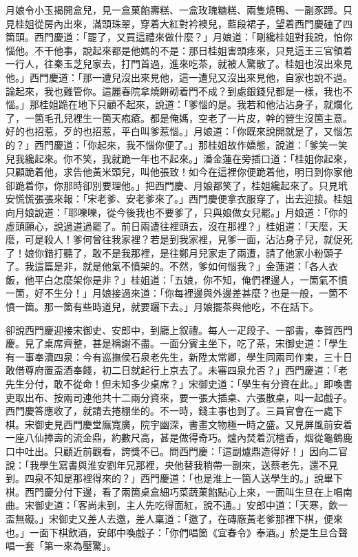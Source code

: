 月娘令小玉揭開盒兒，見一盒菓餡壽糕、一盒玫瑰糖糕、兩隻燒鴨、一副豕蹄。只見桂姐從房內出來，滿頭珠翠，穿着大紅對衿襖兒，藍段裙子，望着西門慶磕了四箇頭。西門慶道：「罷了，又買這禮來做什麼？」月娘道：「剛纔桂姐對我說，怕你惱他。不干他事，說起來都是他媽的不是：那日桂姐害頭疼來，只見這王三官領着一行人，往秦玉芝兒家去，打門首過，進來吃茶，就被人驚散了。桂姐也沒出來見他。」西門慶道：「那一遭兒沒出來見他，這一遭兒又沒出來見他，自家也說不過。論起來，我也難管你。這麗春院拿燒餅砌着門不成？到處銀錢兒都是一樣，我也不惱。」{}那桂姐跪在地下只顧不起來，說道：「爹惱的是。我若和他沾沾身子，就爛化了，一箇毛孔兒裡生一箇天疱瘡。都是俺媽，空老了一片皮，幹的營生沒箇主意。好的也招惹，歹的也招惹，平白叫爹惹惱。」月娘道：「你既來說開就是了，又惱怎的？」西門慶道：「你起來，我不惱你便了。」{}那桂姐故作嬌態，說道：「爹笑一笑兒我纔起來。你不笑，我就跪一年也不起來。」潘金蓮在旁插口道：「桂姐你起來，只顧跪着他，求告他黃米頭兒，叫他張致！如今在這裡你便跪着他，明日到你家他卻跪着你，{}你那時卻別要理他。」{}把西門慶、月娘都笑了，桂姐纔起來了。只見玳安慌慌張張來報：「宋老爹、安老爹來了。」西門慶便拿衣服穿了，出去迎接。桂姐向月娘說道：「耶嚛嚛，從今後我也不要爹了，只與娘做女兒罷。」月娘道：「你的虛頭願心，說過道過罷了。前日兩遭往裡頭去，沒在那裡？」桂姐道：「天麼，天麼，可是殺人！爹何曾往我家裡？{}若是到我家裡，見爹一面，沾沾身子兒，就促死了！娘你錯打聽了，敢不是我那裡，是往鄭月兒家走了兩遭，請了他家小粉頭子了。我這篇是非，就是他氣不憤架的。不然，爹如何惱我？」{}金蓮道：「各人衣飯，他平白怎麼架你是非？」{}桂姐道：「五娘，你不知，俺們裡邊人，一箇氣不憤一箇，好不生分！」月娘接過來道：「你每裡邊與外邊差甚麼？也是一般，一箇不憤一箇。那一箇有些時道兒，就要躧下去。」{}月娘擺茶與他吃，不在話下。

卻說西門慶迎接宋御史、安郎中，到廳上叙禮。每人一疋段子、一部書，奉賀西門慶。見了桌席齊整，甚是稱謝不盡。一面分賓主坐下，吃了茶，宋御史道：「學生有一事奉瀆四泉：今有巡撫侯石泉老先生，新陞太常卿，學生同兩司作東，三十日敢借尊府置盃酒奉餞，初二日就起行上京去了。未審四泉允否？」西門慶道：「老先生分付，敢不從命！但未知多少桌席？」宋御史道：「學生有分資在此。」即喚書吏取出布、按兩司連他共十二兩分資來，要一張大插桌、六張散桌，叫一起戲子。西門慶答應收了，就請去捲棚坐的。不一時，錢主事也到了。三員官會在一處下棋。宋御史見西門慶堂廡寬廣，院宇幽深，書畫文物極一時之盛。又見屏風前安着一座八仙捧壽的流金鼎，約數尺高，甚是做得奇巧。爐內焚着沉檀香，烟從龜鶴鹿口中吐出。只顧近前觀看，誇獎不已。{}問西門慶：「這副爐鼎造得好！」因向二官說：「我學生寫書與淮安劉年兄那裡，央他替我稍帶一副來，送蔡老先，還不見到。四泉不知是那裡得來的？」西門慶道：「也是淮上一箇人送學生的。」說畢下棋。西門慶分付下邊，看了兩箇桌盒細巧菜蔬菓餡點心上來，一面叫生旦在上唱南曲。宋御史道：「客尚未到，主人先吃得面紅，說不通。」安郎中道：「天寒，飲一盃無礙。」宋御史又差人去邀，差人稟道：「邀了，在磚廠黃老爹那裡下棋，便來也。」一面下棋飲酒，安郎中喚戲子：「你們唱箇《宜春令》奉酒。」於是生旦合聲唱一套「第一來為壓驚」。

